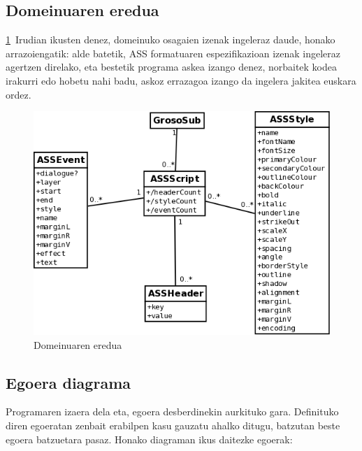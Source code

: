 \subsection{Domeinuaren eredua}
\ref{de}~Irudian ikusten denez, domeinuko osagaien izenak ingeleraz daude, honako arrazoiengatik: alde batetik, ASS formatuaren espezifikazioan izenak ingeleraz agertzen direlako\cite{gu:ass}, eta bestetik programa askea izango denez, norbaitek kodea irakurri edo hobetu nahi badu, askoz errazagoa izango da ingelera jakitea euskara ordez.
\begin{figure}[htp]
\begin{center}
\includegraphics[scale=0.35]{Pictures/Chapter4/Analisia/DE.png}
\caption{Domeinuaren eredua}
\label{de}
\end{center}
\end{figure}

\subsection{Egoera diagrama}
Programaren izaera dela eta, egoera desberdinekin aurkituko gara. Definituko diren egoeratan zenbait erabilpen kasu gauzatu ahalko ditugu, batzutan beste egoera batzuetara pasaz. Honako diagraman ikus daitezke egoerak:

